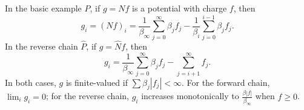 In the basic example $P$, if $g = Nf$ is a potential with charge $f$, then
$$g_i = (Nf)_i = \frac{1}{\beta_\infty} \sum_{j=0}^{\infty} \beta_j f_j - \frac{1}{\beta_i} \sum_{j=0}^{i-1} \beta_j f_j.$$
In the reverse chain $\hat{P}$, if $g = \hat{N}f$, then
$$g_i = \frac{1}{\beta_\infty} \sum_{j=0}^{\infty} \beta_j f_j - \sum_{j=i+1}^{\infty} f_j.$$
In both cases, $g$ is finite-valued if $\sum \beta_j |f_j| < \infty$. For the forward chain, $\lim_i g_i = 0$; for the reverse chain, $g_i$ increases monotonically to $\frac{\beta|f|}{\beta_\infty}$ when $f \geq 0$.

